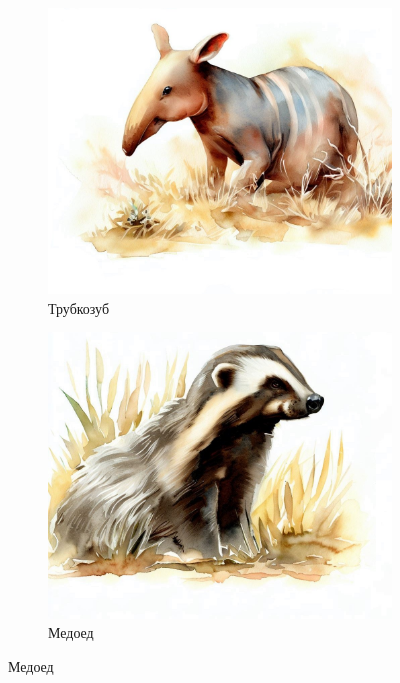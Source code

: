 \documentclass[a5paper,11pt]{memoir}
\begin{document}
\begin{figure}[t]
	\begin{subfigure}{.5\paperwidth}
		\centering
		\includegraphics[width=\linewidth]{images/aardvark}
		\caption{Трубкозуб}
	\end{subfigure}%
	\begin{subfigure}{.5\paperwidth}
		\centering
		\includegraphics[width=\linewidth]{images/honey-badger}
		\caption{Медоед}
	\end{subfigure}
	

\end{figure}
\end{document}
